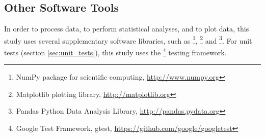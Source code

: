 
\subsection{Other Software Tools}

In order to process data, to perform statistical analyses, and to plot data, this study uses several supplementary software libraries, such as \footnote{NumPy package for scientific computing, \url{http://www.numpy.org}}, \footnote{Matplotlib plotting library, \url{http://matplotlib.org}} and \footnote{Pandas Python Data Analysis Library, \url{http://pandas.pydata.org}}.
For unit tests (section \ref{sec:unit_tests}), this study uses the \footnote{Google Test Framework, gtest, \url{https://github.com/google/googletest}} testing framework.



